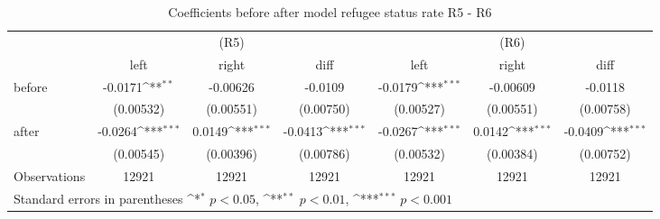 \begin{table}[!ht]\centering \footnotesize
\def\sym#1{\ifmmode^{#1}\else\(^{#1}\)\fi}
\caption{Coefficients before after model refugee status rate R5 - R6}
\begin{tabular}{l*{6}{c}}
\hline\hline
                    &\multicolumn{3}{c}{(R5)}&\multicolumn{3}{c}{(R6)}\\
&\multicolumn{1}{c}{left}&\multicolumn{1}{c}{right}&\multicolumn{1}{c}{diff}&\multicolumn{1}{c}{left}&\multicolumn{1}{c}{right}&\multicolumn{1}{c}{diff}\\
\hline
before              &     -0.0171\sym{**} &    -0.00626         &     -0.0109         &     -0.0179\sym{***}&    -0.00609         &     -0.0118         \\
                    &   (0.00532)         &   (0.00551)         &   (0.00750)         &   (0.00527)         &   (0.00551)         &   (0.00758)         \\
[0,5em]
after               &     -0.0264\sym{***}&      0.0149\sym{***}&     -0.0413\sym{***}&     -0.0267\sym{***}&      0.0142\sym{***}&     -0.0409\sym{***}\\
                    &   (0.00545)         &   (0.00396)         &   (0.00786)         &   (0.00532)         &   (0.00384)         &   (0.00752)         \\
\hline
Observations        &       12921         &       12921         &       12921         &       12921         &       12921         &       12921         \\
\hline\hline
\multicolumn{7}{l}{\footnotesize Standard errors in parentheses \sym{*} \(p<0.05\), \sym{**} \(p<0.01\), \sym{***} \(p<0.001\)}\\
\end{tabular}
\end{table}
